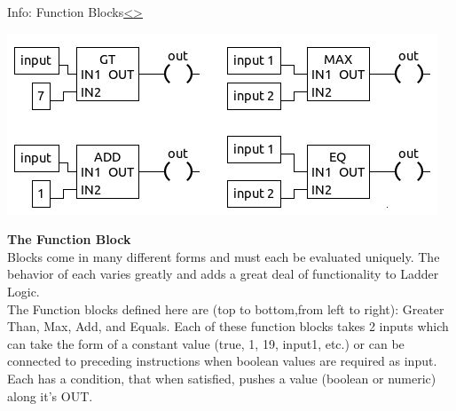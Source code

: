 \documentclass[12pt]{extarticle}
\newenvironment{instructionblock}{\Large\bgroup}{\egroup}
\newcounter{next}
\newcounter{prev}
\begin{document}
\pagebreak
{}
\begin{slide}{Info: Function Blocks}{\hyperref[slide \theprev]{\textless}\hyperref[slide \thenext]{\textgreater}}
	\begin{instructionblock}
		\begin{center}
			\includegraphics[scale=1.2]{figures/FunctionBlock01.JPG}
		\end{center}
	\end{instructionblock}
\end{slide}
\vfill
\noindent
\textbf{The Function Block}\\
Blocks come in many different forms and must each be evaluated uniquely. The behavior of each varies greatly and adds a great deal of functionality to Ladder Logic. \\
The Function blocks defined here are (top to bottom,from left to right): Greater Than, Max, Add, and Equals. Each of these function blocks takes 2 inputs which can take the form of a constant value (true, 1, 19, input1, etc.) or can be connected to preceding instructions when boolean values are required as input. Each has a condition, that when satisfied, pushes a value (boolean or numeric) along it's OUT.
\end{document}
